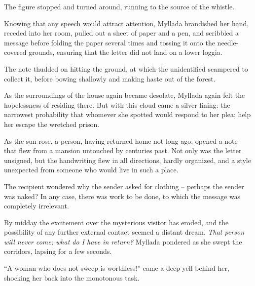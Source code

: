 The figure stopped and turned around, running to the source of the whistle.

Knowing that any speech would attract attention, Myllada brandished her hand, receded into her room, pulled out a sheet of paper and a pen, and scribbled a message before folding the paper several times and tossing it onto the needle-covered grounds, ensuring that the letter did not land on a lower loggia.

The note thudded on hitting the ground, at which the unidentified scampered to collect it, before bowing shallowly and making haste out of the forest.

As the surroundings of the house again became desolate, Myllada again felt the hopelessness of residing there. But with this cloud came a silver lining: the narrowest probability that whomever she spotted would respond to her plea; help her escape the wretched prison.

\centeredstars

As the sun rose, a person, having returned home not long ago, opened a note that flew from a mansion untouched by centuries past. Not only was the letter unsigned, but the handwriting flew in all directions, hardly organized, and a style unexpected from someone who would live in such a place.


The recipient wondered why the sender asked for clothing -- perhaps the sender was naked? In any case, there was work to be done, to which the message was completely irrelevant.

\centeredstars

By midday the excitement over the mysterious visitor has eroded, and the possibility of any further external contact seemed a distant dream. \emph{That person will never come; what do I have in return?} Myllada pondered as she swept the corridors, lapsing for a few seconds.

``A woman who does not sweep is worthless!'' came a deep yell behind her, shocking her back into the monotonous task.

